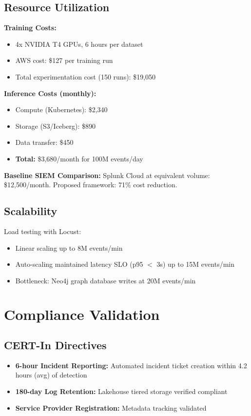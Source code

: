 \subsection{Resource Utilization}
\textbf{Training Costs:}
\begin{itemize}
    \item 4x NVIDIA T4 GPUs, 6 hours per dataset
    \item AWS cost: \$127 per training run
    \item Total experimentation cost (150 runs): \$19,050
\end{itemize}

\textbf{Inference Costs (monthly):}
\begin{itemize}
    \item Compute (Kubernetes): \$2,340
    \item Storage (S3/Iceberg): \$890
    \item Data transfer: \$450
    \item \textbf{Total:} \$3,680/month for 100M events/day
\end{itemize}

\textbf{Baseline SIEM Comparison:} Splunk Cloud at equivalent volume: \$12,500/month. Proposed framework: 71\% cost reduction.

\subsection{Scalability}
Load testing with Locust:
\begin{itemize}
    \item Linear scaling up to 8M events/min
    \item Auto-scaling maintained latency SLO (p95 $<$ 3s) up to 15M events/min
    \item Bottleneck: Neo4j graph database writes at 20M events/min
\end{itemize}

\section{Compliance Validation}\label{sec:eval-compliance}
\subsection{CERT-In Directives}
\begin{itemize}
    \item \textbf{6-hour Incident Reporting:} Automated incident ticket creation within 4.2 hours (avg) of detection
    \item \textbf{180-day Log Retention:} Lakehouse tiered storage verified compliant
    \item \textbf{Service Provider Registration:} Metadata tracking validated
\end{itemize}

